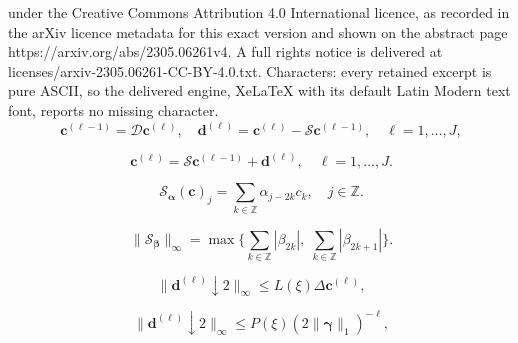 \documentclass[10pt,a4paper]{amsart}
\begin{document}
under the Creative Commons Attribution 4.0 International licence, as recorded in the arXiv licence metadata for this exact version and shown on the abstract page https://arxiv.org/abs/2305.06261v4. A full rights notice is delivered at licenses/arxiv-2305.06261-CC-BY-4.0.txt. Characters: every retained excerpt is pure ASCII, so the delivered engine, XeLaTeX with its default Latin Modern text font, reports no missing character.
\begin{equation}~\label{linear_multiscale_analysis}
\boldsymbol{c}^{(\ell-1)} = \mathcal{D}\boldsymbol{c}^{(\ell)}, \quad \boldsymbol{d}^{(\ell)} = \boldsymbol{c}^{(\ell)} - \mathcal{S}\boldsymbol{c}^{(\ell-1)}, \quad \ell=1,\dots,J,
\end{equation}

\begin{equation}~\label{linear_multiscale_synthesis}
\boldsymbol{c}^{(\ell)} = \mathcal{S}\boldsymbol{c}^{(\ell - 1)} + \boldsymbol{d}^{(\ell)}, \quad \ell=1,\dots,J.
\end{equation}

\begin{equation}~\label{linear_subdivision_scheme}
    \mathcal{S}_{\boldsymbol{\alpha}}(\boldsymbol{c})_j = \sum_{k\in\mathbb{Z}}\alpha_{j-2k}c_k, \quad j\in\mathbb{Z}.
\end{equation}

    \begin{equation}~\label{eqn:subdivision_norm}
        \|\mathcal{S}_{\boldsymbol{\beta}}\|_{\infty} = \max\big\{ \sum_{k\in\mathbb{Z}}|\beta_{2k}|, \; \sum_{k\in\mathbb{Z}}|\beta_{2k+1}|\big\}.
    \end{equation}

    \begin{equation}~\label{linear_details_bound}
        \|\boldsymbol{d}^{(\ell)}\downarrow 2\|_\infty \leq L(\xi)\Delta\boldsymbol{c}^{(\ell)},
    \end{equation}

    \begin{equation}~\label{differentiable_details_bound}
        \|\boldsymbol{d}^{(\ell)}\downarrow 2\|_\infty \leq P(\xi)(2\|\boldsymbol{\gamma}\|_1)^{-\ell},
    \end{equation}
\end{document}
